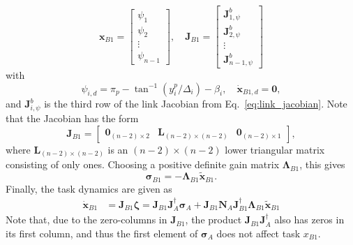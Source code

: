 \documentclass[../main.tex]{subfiles}
\begin{document}
\begin{equation}
    \label{eq:link_LOS}
    \bm{x}_{B1} = \begin{bmatrix}
        \psi_1 \\ \psi_2 \\ \vdots \\ \psi_{n-1}
    \end{bmatrix}, \quad
    \bm{J}_{B1} = \begin{bmatrix}
        \bm{J}_{1, \psi}^b \\ \bm{J}_{2, \psi}^b \\ \vdots \\ \bm{J}_{n-1, \psi}^b
    \end{bmatrix}
\end{equation}
with \begin{equation}
    \psi_{i, d} =
        \pi_p - \tan^{-1}(y_i^p / \Delta_i) - \beta_i,
    \quad
    \dot{\bm{x}}_{B1, d} = \bm{0},
\end{equation}
and $\bm{J}_{i, \psi}^b$ is the third row of the link Jacobian from Eq.~\eqref{eq:link_jacobian}. Note that the Jacobian has the form
\begin{equation}
    \label{eq:LOS_Jacobian_tril}
    \bm{J}_{B1} =
    \begin{bmatrix}
     \bm{0}_{(n-2) \times 2} & \bm{L}_{(n-2) \times (n-2)} & \bm{0}_{(n-2) \times 1}
    \end{bmatrix},
\end{equation}
where $\bm{L}_{(n-2) \times (n-2)}$ is an $(n-2)\times(n-2)$ lower triangular matrix consisting of only ones. Choosing a positive definite gain matrix $\bm{\Lambda}_{B1}$, this gives
\begin{equation}
    \label{eq:sigma_linkLOS}
    \bm{\sigma}_{B1} = -\bm{\Lambda}_{B1} \tilde{\bm{x}}_{B1}.
\end{equation}
Finally, the task dynamics are given as
\begin{align}
    \label{eq:link_LOS_dyn}
    \dot{\bm{x}}_{B1} &= \bm{J}_{B1} \bm{\zeta} = \bm{J}_{B1}\bm{J}_A^{\dagger}\bm{\sigma}_A
    + \bm{J}_{B1} \bm{N}_A \bm{J}_{B1}^\dagger \bm{\Lambda}_{B1} \tilde{\bm{x}}_{B1}
\end{align}
Note that, due to the zero-columns in $\bm{J}_{B1}$, the product $\bm{J}_{B1}\bm{J}_A^{\dagger}$ also has zeros in its first column, and thus the first element of $\bm{\sigma}_A$ does not affect task $x_{B1}$.
\end{document}
